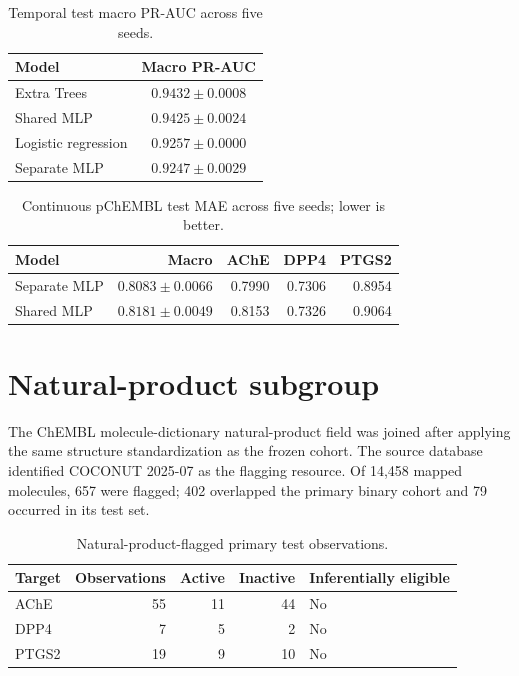 \documentclass[11pt]{article}
\begin{document}
\begin{table}[ht]
\centering
\caption{Temporal test macro PR-AUC across five seeds.}
\begin{tabular}{lc}
\toprule
Model & Macro PR-AUC\\
\midrule
Extra Trees & $0.9432\pm0.0008$\\
Shared MLP & $0.9425\pm0.0024$\\
Logistic regression & $0.9257\pm0.0000$\\
Separate MLP & $0.9247\pm0.0029$\\
\bottomrule
\end{tabular}
\end{table}

\begin{table}[ht]
\centering
\caption{Continuous pChEMBL test MAE across five seeds; lower is better.}
\begin{tabular}{lrrrr}
\toprule
Model & Macro & AChE & DPP4 & PTGS2\\
\midrule
Separate MLP & $0.8083\pm0.0066$ & 0.7990 & 0.7306 & 0.8954\\
Shared MLP & $0.8181\pm0.0049$ & 0.8153 & 0.7326 & 0.9064\\
\bottomrule
\end{tabular}
\end{table}

\section{Natural-product subgroup}

The ChEMBL molecule-dictionary natural-product field was joined after applying
the same structure standardization as the frozen cohort. The source database
identified COCONUT 2025-07 as the flagging resource. Of 14,458 mapped molecules,
657 were flagged; 402 overlapped the primary binary cohort and 79 occurred in
its test set.

\begin{table}[ht]
\centering
\caption{Natural-product-flagged primary test observations.}
\begin{tabular}{lrrrl}
\toprule
Target & Observations & Active & Inactive & Inferentially eligible\\
\midrule
AChE & 55 & 11 & 44 & No\\
DPP4 & 7 & 5 & 2 & No\\
PTGS2 & 19 & 9 & 10 & No\\
\bottomrule
\end{tabular}
\end{table}
\end{document}
